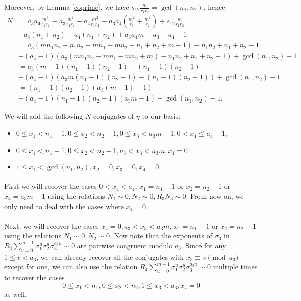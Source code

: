 \documentclass[12pt,a4paper]{article}
\theoremstyle{definition}
\begin{document}
Moreover, by Lemma \ref{coprime}, we have $s_{12}\frac{m}{r_1r_2}=\gcd(n_1,n_2)$, hence
\begin{align*}
N&=a_3a_4\frac{m^3}{r_1r_2}-a_3\frac{m^2}{r_1r_2}-a_4\frac{m^2}{r_1r_2}-a_3a_4\left(\frac{m^2}{r_1}+\frac{m^2}{r_2}\right)+s_{12}\frac{m}{r_1r_2}\\
&+a_3(n_1+n_2)+a_4(n_1+n_2)+a_3a_4m-a_3-a_4-1\\
&=a_3\left(mn_1n_2-n_1n_2 -mn_1-mn_2+n_1+n_2+m-1\right)-n_1n_2+n_1+n_2-1\\
&+(a_4-1)(a_3\left(mn_1n_2 -mn_1-mn_2+m\right)-n_1n_2+n_1+n_2-1)+\gcd(n_1,n_2)-1\\
&=a_3\left(m-1\right)\left(n_1-1\right)\left(n_2-1\right)-\left(n_1-1\right)\left(n_2-1\right)\\
&+(a_4-1)\left(a_3m\left(n_1-1\right)\left(n_2-1\right)-\left(n_1-1\right)\left(n_2-1\right)\right)+\gcd(n_1,n_2)-1\\
&=(n_1-1)(n_2-1)(a_3(m-1)-1)\\
&+(a_4-1)(n_1-1)(n_2-1)(a_3m-1)+\gcd(n_1,n_2)-1.
\end{align*}

We will add the following $N$ conjugates of $\eta$ to our basis:
\begin{itemize}
\item $0\leq x_1<n_1-1, 0\leq x_2<n_2-1, 0\leq x_3<a_3m-1, 0<x_4\leq a_4-1$,
\item $0\leq x_1<n_1-1, 0\leq x_2<n_2-1, a_3<x_3<a_3m, x_4=0$
\item $1\leq x_1<\gcd(n_1,n_2) , x_2=0, x_3=0, x_4=0$.
\end{itemize}

\paragraph*{}
First we will recover the cases $0<x_4<a_4$, $x_1=n_1-1$ or $x_2=n_2-1$ or $x_3=a_3m-1$ using the relations $N_1\sim 0, N_2\sim 0, R_3N_3\sim 0$. From now on, we only need to deal with the cases where $x_4=0$.
\paragraph*{}
Next, we will recover the cases $x_4=0, a_3< x_3<a_3m$, $x_1=n_1-1$ or $x_2=n_2-1$ using the relations $N_1\sim 0, N_2\sim 0$. Now note that the exponents of $\sigma_3$ in $R_4\sum_{u=0}^{m-1}\sigma_1^{u}\sigma_2^{u}\sigma_3^{a_3u}\sim 0$ are pairwise congruent modulo $a_3$. Since for any $1\leq v<a_3$, we can already recover all the conjugates with $x_3\equiv v \pmod{a_3}$ except for one, we can also use the relation $R_4\sum_{u=0}^{m-1}\sigma_1^{u}\sigma_2^{u}\sigma_3^{a_3u}\sim 0$ multiple times to recover the cases $$0\leq x_1<n_1, 0\leq x_2< n_2, 1\leq x_3<a_3, x_4=0$$ as well.
\end{document}
